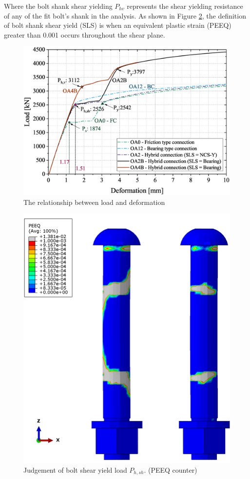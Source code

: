 Where the bolt shank shear yielding $P_{hv}$ represents the shear yielding resistance of any of the fit bolt's shank in the analysis. As shown in Figure \ref{fig-bsh-jud-peeq}, the definition of bolt shank shear yield (SLS) is when an equivalent plastic strain (PEEQ) greater than 0.001 occurs throughout the shear plane.

\begin{figure}
    \centering
    \includegraphics[width=\linewidth]{imgs/ch7/LDef-total.eps}
    \caption{The relationship between load and deformation}
    \label{fig-ldef}
\end{figure}

\begin{figure}
    \centering
    \includegraphics[width=0.6\linewidth]{imgs/ch7/bsh-jud-peeq.png}
    \caption{Judgement of bolt shear yield load $P_{h,sh}$. (PEEQ counter)}
    \label{fig-bsh-jud-peeq}
\end{figure}

